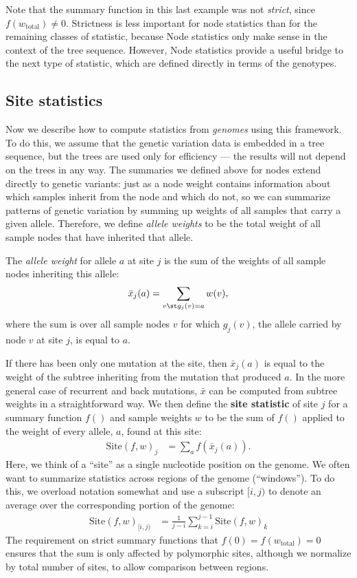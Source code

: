 \documentclass{article}
\newcommand{\site}{\mbox{Site}} %
\newcommand{\iw}{w} %
\newcommand{\tiw}{w_\text{total}} %
\newcommand{\aw}{{\bar x}} %
\begin{document}
Note that the summary function in this last example was not \emph{strict}, since $f(\tiw) \neq 0$.
Strictness is less important for node statistics than for the remaining classes of statistic,
because Node statistics only make sense in the context of the tree sequence.
However, Node statistics provide a useful bridge to the next type of statistic,
which are defined directly in terms of the genotypes.


\subsection*{Site statistics}

Now we describe how to compute statistics from \emph{genomes} using this framework.
To do this, we assume that the genetic variation data is embedded in a tree sequence,
but the trees are used only for efficiency --- the results will not depend on
the trees in any way. The summaries we defined above for nodes
extend directly to genetic variants: just as a node weight contains information about
which samples inherit from the node and which do not,
so we can summarize patterns of genetic variation by summing up weights of all samples
that carry a given allele.
Therefore, we define \emph{allele weights} to be
the total weight of all sample nodes that have inherited that allele.

\begin{definition}
    The \emph{allele weight} for allele $a$ at site $j$ is the sum of the weights
    of all sample nodes inheriting this allele:
    \begin{align*}
        \aw_j(a) = \sum_{v \st g_j(v) = a} \iw(v) ,
    \end{align*}
    where the sum is over all sample nodes $v$ for which
    $g_j(v)$, the allele carried by node $v$ at site $j$, is equal to $a$.
\end{definition}

If there has been only one mutation at the site,
then $\aw_j(a)$ is equal to the weight of the subtree inheriting from the mutation that produced $a$.
In the more general case of recurrent and back mutations, $\aw$ can
be computed from subtree weights in a straightforward way.
We then define the \textbf{site statistic} of site $j$ for a summary function $f()$
and sample weights $\iw$ to be the sum of $f()$
applied to the weight of every allele, $a$, found at this site:
\begin{align}
    \site(f, \iw)_j
    &=
    \sum_{a} f(\aw_j(a)).
\end{align}
Here, we think of a ``site'' as a single nucleotide position on the genome.
We often want to summarize statistics across regions of the genome (``windows'').
To do this, we overload notation somewhat and use a subscript $[i,j)$ to denote an average
over the corresponding portion of the genome:
\begin{align}
    \site(f, \iw)_{[i,j)}
    &=
    \frac{1}{j-i} \sum_{k=i}^{j-1} \site(f, \iw)_k
\end{align}
The requirement on strict summary functions that $f(0) = f(\tiw) = 0$
ensures that the sum is only affected by polymorphic sites,
although we normalize by total number of sites, to allow comparison between regions.
\end{document}
